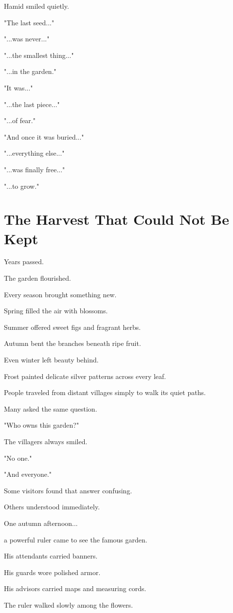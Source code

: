 \documentclass[12pt,openany]{book}
\begin{document}
Hamid smiled quietly.

"The last seed..."

"...was never..."

"...the smallest thing..."

"...in the garden."

"It was..."

"...the last piece..."

"...of fear."

"And once it was buried..."

"...everything else..."

"...was finally free..."

"...to grow."
\section*{The Harvest That Could Not Be Kept}

Years passed.

The garden flourished.

Every season brought something new.

Spring filled the air with blossoms.

Summer offered sweet figs and fragrant herbs.

Autumn bent the branches beneath ripe fruit.

Even winter left beauty behind.

Frost painted delicate silver patterns across every leaf.

People traveled from distant villages simply to walk its quiet paths.

Many asked the same question.

"Who owns this garden?"

The villagers always smiled.

"No one."

"And everyone."

Some visitors found that answer confusing.

Others understood immediately.

One autumn afternoon...

a powerful ruler came to see the famous garden.

His attendants carried banners.

His guards wore polished armor.

His advisors carried maps and measuring cords.

The ruler walked slowly among the flowers.
\end{document}
